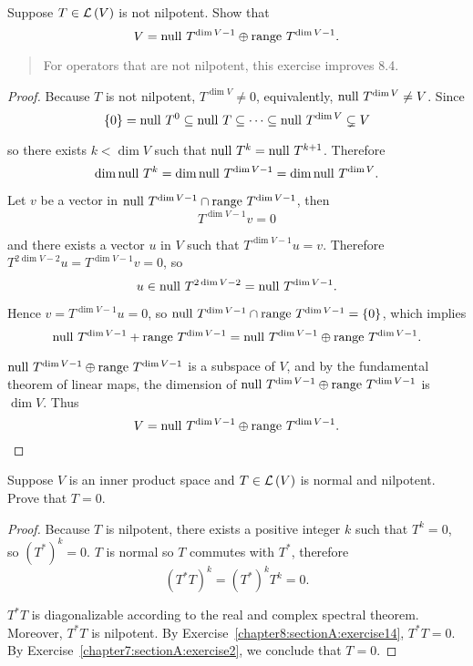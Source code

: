 \begin{exercise}\label{chapter8:sectionA:exercise19}
    Suppose $T\in\mathcal{L}\left({V}\right)$ is not nilpotent. Show that
    \[
        V = \operatorname{null}\,{T^{\dim V - 1}} \oplus \operatorname{range}\,{T^{\dim V - 1}}.
    \]
\end{exercise}

\begin{quote}
    For operators that are not nilpotent, this exercise improves 8.4.
\end{quote}

\begin{proof}
    Because $T$ is not nilpotent, $T^{\dim V}\ne 0$, equivalently, $\operatorname{null}\,{T^{\dim V}}\ne V$. Since
    \[
        \{0\} = \operatorname{null}\,{T^{0}}\subseteq \operatorname{null}\,{T}\subseteq \cdots \subseteq \operatorname{null}\,{T^{\dim V}} \subsetneq V
    \]

    so there exists $k < \dim V$ such that $\operatorname{null}\,{T^{k}} = \operatorname{null}\,{T^{k+1}}$. Therefore
    \[
        \dim \operatorname{null}\,{T^{k}} = \dim \operatorname{null}\,{T^{\dim V - 1}} = \dim \operatorname{null}\,{T^{\dim V}}.
    \]

    Let $v$ be a vector in $\operatorname{null}\,{T^{\dim V - 1}} \cap \operatorname{range}\,{T^{\dim V - 1}}$, then
    \[
        T^{\dim V - 1}v = 0
    \]

    and there exists a vector $u$ in $V$ such that $T^{\dim V - 1}u = v$. Therefore $T^{2\dim V - 2}u = T^{\dim V - 1}v = 0$, so
    \[
        u\in \operatorname{null}\,{T^{2\dim V - 2}} = \operatorname{null}\,{T^{\dim V - 1}}.
    \]

    Hence $v = T^{\dim V - 1}u = 0$, so $\operatorname{null}\,{T^{\dim V - 1}} \cap \operatorname{range}\,{T^{\dim V - 1}} = \{0\}$, which implies
    \[
        \operatorname{null}\,{T^{\dim V - 1}} + \operatorname{range}\,{T^{\dim V - 1}} = \operatorname{null}\,{T^{\dim V - 1}} \oplus \operatorname{range}\,{T^{\dim V - 1}}.
    \]

    $\operatorname{null}\,{T^{\dim V - 1}} \oplus \operatorname{range}\,{T^{\dim V - 1}}$ is a subspace of $V$, and by the fundamental theorem of linear maps, the dimension of $\operatorname{null}\,{T^{\dim V - 1}} \oplus \operatorname{range}\,{T^{\dim V - 1}}$ is $\dim V$. Thus
    \[
        V = \operatorname{null}\,{T^{\dim V - 1}} \oplus \operatorname{range}\,{T^{\dim V - 1}}.\qedhere
    \]
\end{proof}
\newpage

\begin{exercise}\label{chapter8:sectionA:exercise20}
    Suppose $V$ is an inner product space and $T\in\mathcal{L}\left({V}\right)$ is normal and nilpotent. Prove that $T = 0$.
\end{exercise}

\begin{proof}
    Because $T$ is nilpotent, there exists a positive integer $k$ such that $T^{k} = 0$, so ${(T^{*})}^{k} = 0$. $T$ is normal so $T$ commutes with $T^{*}$, therefore
    \[
        {(T^{*}T)}^{k} = {(T^{*})}^{k}T^{k} = 0.
    \]

    $T^{*}T$ is diagonalizable according to the real and complex spectral theorem. Moreover, $T^{*}T$ is nilpotent. By Exercise~\ref{chapter8:sectionA:exercise14}, $T^{*}T = 0$. By Exercise~\ref{chapter7:sectionA:exercise2}, we conclude that $T = 0$.
\end{proof}
\newpage

